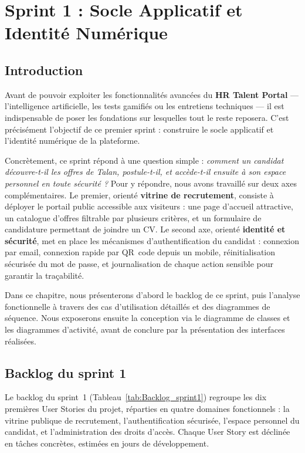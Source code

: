 \chapter{Sprint 1 : Socle Applicatif et Identité Numérique}
\label{chap:sprint1}
\setlength{\fboxsep}{1pt}
\setlength{\fboxrule}{0.4pt}

\section{Introduction}

Avant de pouvoir exploiter les fonctionnalités avancées du \textbf{HR Talent Portal} --- l'intelligence artificielle, les tests gamifiés ou les entretiens techniques --- il est indispensable de poser les fondations sur lesquelles tout le reste reposera. C'est précisément l'objectif de ce premier sprint : construire le socle applicatif et l'identité numérique de la plateforme.

\medskip

Concrètement, ce sprint répond à une question simple : \textit{comment un candidat découvre-t-il les offres de Talan, postule-t-il, et accède-t-il ensuite à son espace personnel en toute sécurité ?} Pour y répondre, nous avons travaillé sur deux axes complémentaires. Le premier, orienté \textbf{vitrine de recrutement}, consiste à déployer le portail public accessible aux visiteurs : une page d'accueil attractive, un catalogue d'offres filtrable par plusieurs critères, et un formulaire de candidature permettant de joindre un CV. Le second axe, orienté \textbf{identité et sécurité}, met en place les mécanismes d'authentification du candidat : connexion par email, connexion rapide par QR~code depuis un mobile, réinitialisation sécurisée du mot de passe, et journalisation de chaque action sensible pour garantir la traçabilité.

\medskip

Dans ce chapitre, nous présenterons d'abord le backlog de ce sprint, puis l'analyse fonctionnelle à travers des cas d'utilisation détaillés et des diagrammes de séquence. Nous exposerons ensuite la conception via le diagramme de classes et les diagrammes d'activité, avant de conclure par la présentation des interfaces réalisées.

\section{Backlog du sprint 1}

Le backlog du sprint~1 (Tableau~\ref{tab:Backlog_sprint1}) regroupe les dix premières User Stories du projet, réparties en quatre domaines fonctionnels : la vitrine publique de recrutement, l'authentification sécurisée, l'espace personnel du candidat, et l'administration des droits d'accès. Chaque User Story est déclinée en tâches concrètes, estimées en jours de développement.
\\
\\
\\
\\

